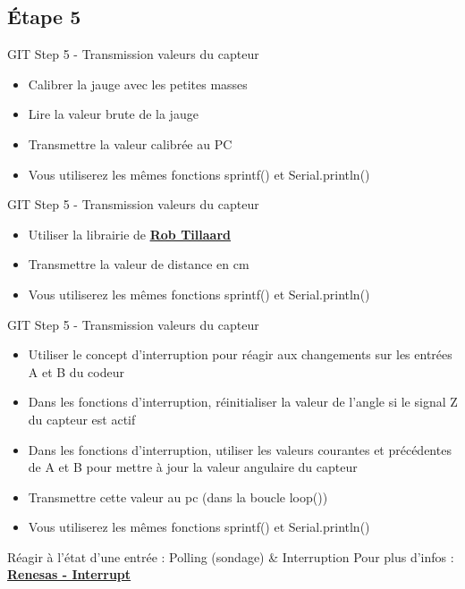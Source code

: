 \documentclass[a4paper,11pt]{beamer}
\begin{document}
\subsection{Étape 5}
\begin{frame}
\begin{exampleblock}{GIT Step 5 - Transmission valeurs du capteur}
\begin{itemize}
\item Calibrer la jauge avec les petites masses
\item Lire la valeur brute de la jauge
\item Transmettre la valeur calibrée au PC
\item Vous utiliserez les mêmes fonctions sprintf() et Serial.println()
\end{itemize}
\end{exampleblock}
\begin{exampleblock}{GIT Step 5 - Transmission valeurs du capteur}
\begin{itemize}
\item Utiliser la librairie de \textcolor{blue}{\textbf{\underline{\href{https://github.com/RobTillaart/SRF05}{Rob Tillaard}}}}
\item Transmettre la valeur de distance en cm
\item Vous utiliserez les mêmes fonctions sprintf() et Serial.println()
\end{itemize}
\end{exampleblock}
\end{frame}

\begin{frame}
\begin{exampleblock}{GIT Step 5 - Transmission valeurs du capteur}
\begin{itemize}
\item Utiliser le concept d'interruption pour réagir aux changements sur les entrées A et B du codeur
\item Dans les fonctions d'interruption, réinitialiser la valeur de l'angle si le signal Z du capteur est actif
\item Dans les fonctions d'interruption, utiliser les valeurs courantes et précédentes de A et B pour mettre à jour la valeur angulaire du capteur
\item Transmettre cette valeur au pc (dans la boucle loop())
\item Vous utiliserez les mêmes fonctions sprintf() et Serial.println()
\end{itemize}
\end{exampleblock}

\begin{alertblock}{Réagir à l'état d'une entrée : Polling (sondage) \& Interruption}
\centering
Pour plus d'infos : \textcolor{blue}{\textbf{\underline{\href{https://www.renesas.com/en/support/engineer-school/mcu-programming-peripherals-04-interrupts?srsltid=AfmBOoqWcjzACMZnxzxworQ_vp2hO_V4Mo23lAOhOzdPNzWOe2h45C7q}{Renesas - Interrupt}}}}
\end{alertblock}
\end{frame}
\end{document}
